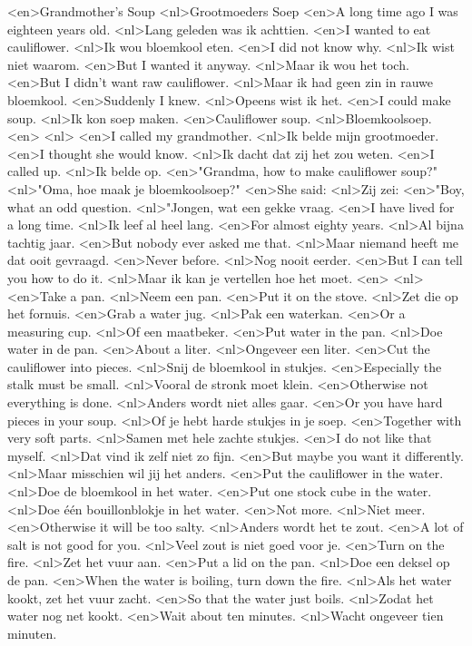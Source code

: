 <en>Grandmother's Soup
<nl>Grootmoeders Soep
<en>A long time ago I was eighteen years old.
<nl>Lang geleden was ik achttien.
<en>I wanted to eat cauliflower.
<nl>Ik wou bloemkool eten.
<en>I did not know why.
<nl>Ik wist niet waarom.
<en>But I wanted it anyway.
<nl>Maar ik wou het toch.
<en>But I didn't want raw cauliflower.
<nl>Maar ik had geen zin in rauwe bloemkool.
<en>Suddenly I knew.
<nl>Opeens wist ik het.
<en>I could make soup.
<nl>Ik kon soep maken.
<en>Cauliflower soup.
<nl>Bloemkoolsoep.
<en>
<nl>
<en>I called my grandmother.
<nl>Ik belde mijn grootmoeder.
<en>I thought she would know.
<nl>Ik dacht dat zij het zou weten.
<en>I called up.
<nl>Ik belde op.
<en>"Grandma, how to make cauliflower soup?"
<nl>"Oma, hoe maak je bloemkoolsoep?"
<en>She said:
<nl>Zij zei:
<en>"Boy, what an odd question.
<nl>"Jongen, wat een gekke vraag.
<en>I have lived for a long time.
<nl>Ik leef al heel lang.
<en>For almost eighty years.
<nl>Al bijna tachtig jaar.
<en>But nobody ever asked me that.
<nl>Maar niemand heeft me dat ooit gevraagd.
<en>Never before.
<nl>Nog nooit eerder.
<en>But I can tell you how to do it.
<nl>Maar ik kan je vertellen hoe het moet.
<en>
<nl>
<en>Take a pan.
<nl>Neem een pan.
<en>Put it on the stove.
<nl>Zet die op het fornuis.
<en>Grab a water jug.
<nl>Pak een waterkan.
<en>Or a measuring cup.
<nl>Of een maatbeker.
<en>Put water in the pan.
<nl>Doe water in de pan.
<en>About a liter.
<nl>Ongeveer een liter.
<en>Cut the cauliflower into pieces.
<nl>Snij de bloemkool in stukjes.
<en>Especially the stalk must be small.
<nl>Vooral de stronk moet klein.
<en>Otherwise not everything is done.
<nl>Anders wordt niet alles gaar.
<en>Or you have hard pieces in your soup.
<nl>Of je hebt harde stukjes in je soep.
<en>Together with very soft parts.
<nl>Samen met hele zachte stukjes.
<en>I do not like that myself.
<nl>Dat vind ik zelf niet zo fijn.
<en>But maybe you want it differently.
<nl>Maar misschien wil jij het anders.
<en>Put the cauliflower in the water.
<nl>Doe de bloemkool in het water.
<en>Put one stock cube in the water.
<nl>Doe \'e\'en bouillonblokje in het water.
<en>Not more.
<nl>Niet meer.
<en>Otherwise it will be too salty.
<nl>Anders wordt het te zout.
<en>A lot of salt is not good for you.
<nl>Veel zout is niet goed voor je.
<en>Turn on the fire.
<nl>Zet het vuur aan.
<en>Put a lid on the pan.
<nl>Doe een deksel op de pan.
<en>When the water is boiling, turn down the fire.
<nl>Als het water kookt, zet het vuur zacht.
<en>So that the water just boils.
<nl>Zodat het water nog net kookt.
<en>Wait about ten minutes.
<nl>Wacht ongeveer tien minuten.

